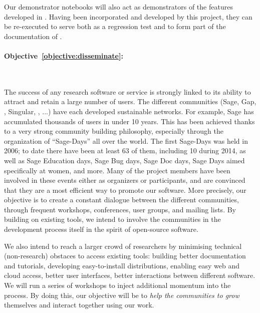 \documentclass[noworkareas,deliverables,\classoptions]{euproposal}       %
\begin{document}
\begin{proposal}
Our demonstrator notebooks will also act as demonstrators of the
features developed in \TheProject. Having been incorporated and
developed by this project, they can be re-executed to serve both as a
regression test and to form part of the documentation of \TheProject.



\paragraph{Objective~\ref{objective:disseminate}: }\ 

The success of any research software or service is strongly linked to
its ability to attract and retain a large number of users. The
different communities (Sage, Gap, \PariGP, Singular, \Jupyter, ...)
have each developed sustainable networks. For example, Sage has
accumulated thousands of users in under 10 years. This has been
achieved thanks to a very strong community building philosophy,
especially through the organization of ``Sage-Days'' all over the
world. The first Sage-Days was held in 2006; to date there have been
at least 63 of them, including 10 during 2014, as well as Sage
Education days, Sage Bug days, Sage Doc days, Sage Days aimed
specifically at women, and more. Many of the \TheProject{} project
members have been involved in these events either as organizers or
participants, and are convinced that they are a most efficient way to
promote our software. More precisely, our objective is to create a
constant dialogue between the different communities, through frequent
workshops, conferences, user groups, and mailing lists. By building on
existing tools, we intend to involve the communities in the
development process itself in the spirit of open-source software.

We also intend to reach a larger crowd of researchers by minimising
technical (non-research) obstaces to access existing tools: building
better documentation and tutorials, developing easy-to-install
distributions, enabling easy web and cloud access, better user
interfaces, better interactions between different software.  We will
run a series of workshops to inject additional momentum into the
process. By doing this, our objective will be to \emph{help the
  communities to grow} themselves and interact together using our
work.



\end{proposal}
\end{document}
